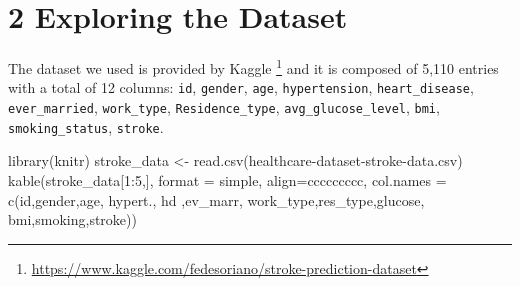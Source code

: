 \documentclass[
]{article}
\newenvironment{Shaded}{\begin{snugshade}}{\end{snugshade}}
\newcommand{\AttributeTok}[1]{\textcolor[rgb]{0.77,0.63,0.00}{#1}}
\newcommand{\DecValTok}[1]{\textcolor[rgb]{0.00,0.00,0.81}{#1}}
\newcommand{\FunctionTok}[1]{\textcolor[rgb]{0.00,0.00,0.00}{#1}}
\newcommand{\NormalTok}[1]{#1}
\newcommand{\OtherTok}[1]{\textcolor[rgb]{0.56,0.35,0.01}{#1}}
\newcommand{\SpecialCharTok}[1]{\textcolor[rgb]{0.00,0.00,0.00}{#1}}
\newcommand{\StringTok}[1]{\textcolor[rgb]{0.31,0.60,0.02}{#1}}
\begin{document}
\hypertarget{exploring-the-dataset}{%
\section{2 Exploring the Dataset}\label{exploring-the-dataset}}

The dataset we used is provided by Kaggle \footnote{\url{https://www.kaggle.com/fedesoriano/stroke-prediction-dataset}}
and it is composed of 5,110 entries with a total of 12 columns:
\texttt{id}, \texttt{gender}, \texttt{age}, \texttt{hypertension},
\texttt{heart\_disease}, \texttt{ever\_married}, \texttt{work\_type},
\texttt{Residence\_type}, \texttt{avg\_glucose\_level}, \texttt{bmi},
\texttt{smoking\_status}, \texttt{stroke}.

\begin{Shaded}
\begin{Highlighting}[]
\FunctionTok{library}\NormalTok{(knitr)}
\NormalTok{stroke\_data }\OtherTok{\textless{}{-}} \FunctionTok{read.csv}\NormalTok{(}\StringTok{\textquotesingle{}healthcare{-}dataset{-}stroke{-}data.csv\textquotesingle{}}\NormalTok{)}
\FunctionTok{kable}\NormalTok{(stroke\_data[}\DecValTok{1}\SpecialCharTok{:}\DecValTok{5}\NormalTok{,], }\AttributeTok{format =} \StringTok{\textquotesingle{}simple\textquotesingle{}}\NormalTok{, }\AttributeTok{align=}\StringTok{\textquotesingle{}ccccccccc\textquotesingle{}}\NormalTok{, }
      \AttributeTok{col.names =} \FunctionTok{c}\NormalTok{(}\StringTok{\textquotesingle{}id\textquotesingle{}}\NormalTok{,}\StringTok{\textquotesingle{}gender\textquotesingle{}}\NormalTok{,}\StringTok{\textquotesingle{}age\textquotesingle{}}\NormalTok{, }\StringTok{\textquotesingle{}hypert.\textquotesingle{}}\NormalTok{, }\StringTok{\textquotesingle{}hd\textquotesingle{}}\NormalTok{ ,}\StringTok{\textquotesingle{}ev\_marr\textquotesingle{}}\NormalTok{,}
                    \StringTok{\textquotesingle{}work\_type\textquotesingle{}}\NormalTok{,}\StringTok{\textquotesingle{}res\_type\textquotesingle{}}\NormalTok{,}\StringTok{\textquotesingle{}glucose\textquotesingle{}}\NormalTok{, }\StringTok{\textquotesingle{}bmi\textquotesingle{}}\NormalTok{,}\StringTok{\textquotesingle{}smoking\textquotesingle{}}\NormalTok{,}\StringTok{\textquotesingle{}stroke\textquotesingle{}}\NormalTok{))}
\end{Highlighting}
\end{Shaded}
\end{document}
